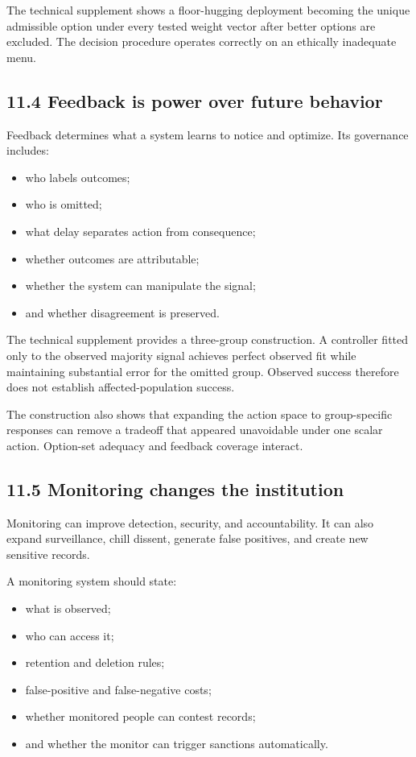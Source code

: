 \documentclass[
  11pt,
]{article}
\providecommand{\tightlist}{%
  \setlength{\itemsep}{0pt}\setlength{\parskip}{0pt}}
\begin{document}
The technical supplement shows a floor-hugging deployment becoming the
unique admissible option under every tested weight vector after better
options are excluded. The decision procedure operates correctly on an
ethically inadequate menu.

\subsection{11.4 Feedback is power over future
behavior}\label{feedback-is-power-over-future-behavior}

Feedback determines what a system learns to notice and optimize. Its
governance includes:

\begin{itemize}
\tightlist
\item
  who labels outcomes;
\item
  who is omitted;
\item
  what delay separates action from consequence;
\item
  whether outcomes are attributable;
\item
  whether the system can manipulate the signal;
\item
  and whether disagreement is preserved.
\end{itemize}

The technical supplement provides a three-group construction. A
controller fitted only to the observed majority signal achieves perfect
observed fit while maintaining substantial error for the omitted group.
Observed success therefore does not establish affected-population
success.

The construction also shows that expanding the action space to
group-specific responses can remove a tradeoff that appeared unavoidable
under one scalar action. Option-set adequacy and feedback coverage
interact.

\subsection{11.5 Monitoring changes the
institution}\label{monitoring-changes-the-institution}

Monitoring can improve detection, security, and accountability. It can
also expand surveillance, chill dissent, generate false positives, and
create new sensitive records.

A monitoring system should state:

\begin{itemize}
\tightlist
\item
  what is observed;
\item
  who can access it;
\item
  retention and deletion rules;
\item
  false-positive and false-negative costs;
\item
  whether monitored people can contest records;
\item
  and whether the monitor can trigger sanctions automatically.
\end{itemize}
\end{document}
